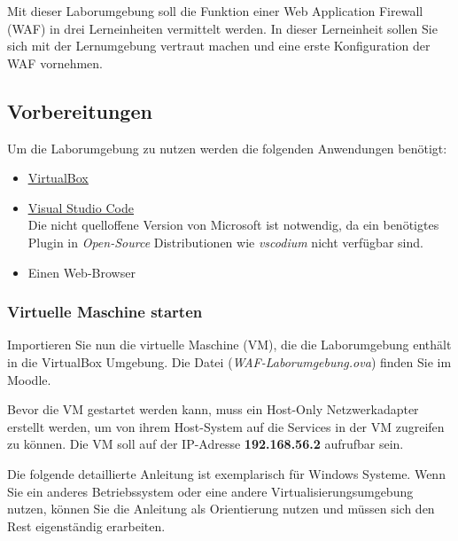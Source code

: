 Mit dieser Laborumgebung soll die Funktion einer Web Application Firewall (WAF) in drei Lerneinheiten vermittelt werden.
In dieser Lerneinheit sollen Sie sich mit der Lernumgebung vertraut machen und eine erste Konfiguration der WAF vornehmen.

\subsection{Vorbereitungen}
\label{sec:learning-unit-1-preparations}

Um die Laborumgebung zu nutzen werden die folgenden Anwendungen benötigt:
\begin{itemize}
    \item \href{https://www.virtualbox.org/}{\underline{VirtualBox}}
    \item \href{https://code.visualstudio.com/download}{\underline{Visual Studio Code}}\\
    Die nicht quelloffene Version von Microsoft ist notwendig, da ein benötigtes Plugin in \textit{Open-Source} Distributionen wie \textit{vscodium} nicht verfügbar sind.
    \item Einen Web-Browser
\end{itemize}

\subsubsection{Virtuelle Maschine starten}
Importieren Sie nun die virtuelle Maschine (VM),  die die Laborumgebung enthält in die VirtualBox Umgebung.
Die Datei (\textit{WAF-Laborumgebung.ova}) finden Sie im Moodle.

Bevor die VM gestartet werden kann, muss ein Host-Only Netzwerkadapter erstellt werden, um von ihrem Host-System auf die Services in der VM zugreifen zu können.
Die VM soll auf der IP-Adresse \textbf{192.168.56.2} aufrufbar sein.

Die folgende detaillierte Anleitung ist exemplarisch für Windows Systeme.
Wenn Sie ein anderes Betriebssystem oder eine andere Virtualisierungsumgebung nutzen, können Sie die Anleitung als Orientierung nutzen und müssen sich den Rest eigenständig erarbeiten.

